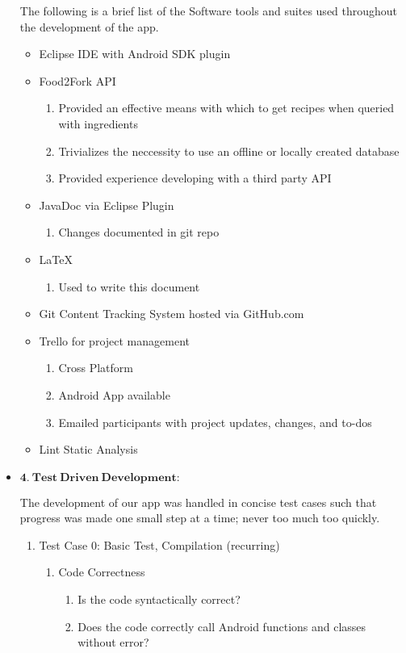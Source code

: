 \documentclass[a4paper,11pt]{article}
\begin{document}
\begin{itemize}
\parindent 30pt
The following is a brief list of the Software tools and suites used throughout the development of the app.
\begin{itemize}
\item Eclipse IDE with Android SDK plugin
\item Food2Fork API
	\begin{enumerate}
	\item Provided an effective means with which to get recipes when queried with ingredients
	\item Trivializes the neccessity to use an offline or locally created database
	\item Provided experience developing with a third party API
	\end{enumerate}
\item JavaDoc via Eclipse Plugin
	\begin{enumerate}
	\item Changes documented in git repo
	\end{enumerate}
\item LaTeX
	\begin{enumerate}
	\item Used to write this document
	\end{enumerate}
\item Git Content Tracking System hosted via GitHub.com
\item Trello for project management
	\begin{enumerate}
	\item Cross Platform
	\item Android App available
	\item Emailed participants with project updates, changes, and to-dos
	\end{enumerate}
\item Lint Static Analysis
\end{itemize}

\newpage
\item $\mathbf{4.\ Test\ Driven\ Development:}$
\parindent 30pt

The development of our app was handled in concise test cases such that progress was made one small step at a time; never too much too quickly. \
\begin{enumerate}
\item Test Case 0: Basic Test, Compilation (recurring)
	\begin{enumerate}
	\item Code Correctness
		\begin{enumerate}
		\item Is the code syntactically correct?
		\item Does the code correctly call Android functions and classes without error?
		\end{enumerate}
	\end{enumerate}


\end{enumerate}
\end{itemize}
\end{document}
